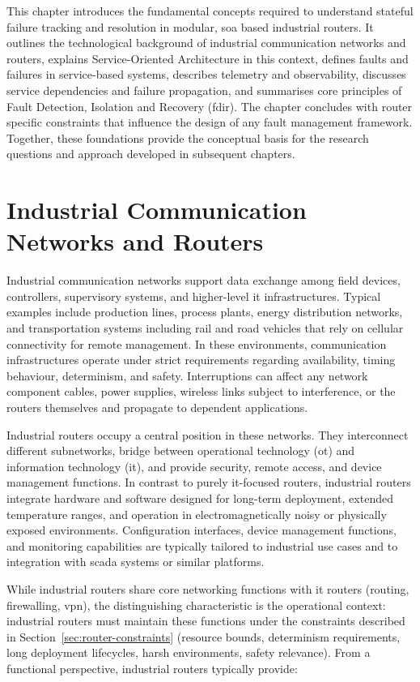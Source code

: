 This chapter introduces the fundamental concepts required to understand stateful failure tracking and resolution in modular, \gls{soa} based industrial routers. It outlines the technological background of industrial communication networks and routers, explains Service-Oriented Architecture in this context, defines faults and failures in service-based systems, describes telemetry and observability, discusses service dependencies and failure propagation, and summarises core principles of Fault Detection, Isolation and Recovery (\gls{fdir}). The chapter concludes with router specific constraints that influence the design of any fault management framework. Together, these foundations provide the conceptual basis for the research questions and approach developed in subsequent chapters.

\section{Industrial Communication Networks and Routers}\label{sec:industrial-networks}

Industrial communication networks support data exchange among field devices, controllers, supervisory systems, and higher-level \gls{it} infrastructures. Typical examples include production lines, process plants, energy distribution networks, and transportation systems including rail and road vehicles that rely on cellular connectivity for remote management. In these environments, communication infrastructures operate under strict requirements regarding availability, timing behaviour, determinism, and safety. Interruptions can affect any network component cables, power supplies, wireless links subject to interference, or the routers themselves and propagate to dependent applications.

Industrial routers occupy a central position in these networks. They interconnect different subnetworks, bridge between operational technology (\gls{ot}) and information technology (\gls{it}), and provide security, remote access, and device management functions. In contrast to purely \gls{it}-focused routers, industrial routers integrate hardware and software designed for long-term deployment, extended temperature ranges, and operation in electromagnetically noisy or physically exposed environments. Configuration interfaces, device management functions, and monitoring capabilities are typically tailored to industrial use cases and to integration with \gls{scada} systems or similar platforms.

While industrial routers share core networking functions with \gls{it} routers (routing, firewalling, \gls{vpn}), the distinguishing characteristic is the operational context: industrial routers must maintain these functions under the constraints described in Section~\ref{sec:router-constraints} (resource bounds, determinism requirements, long deployment lifecycles, harsh environments, safety relevance). From a functional perspective, industrial routers typically provide:

